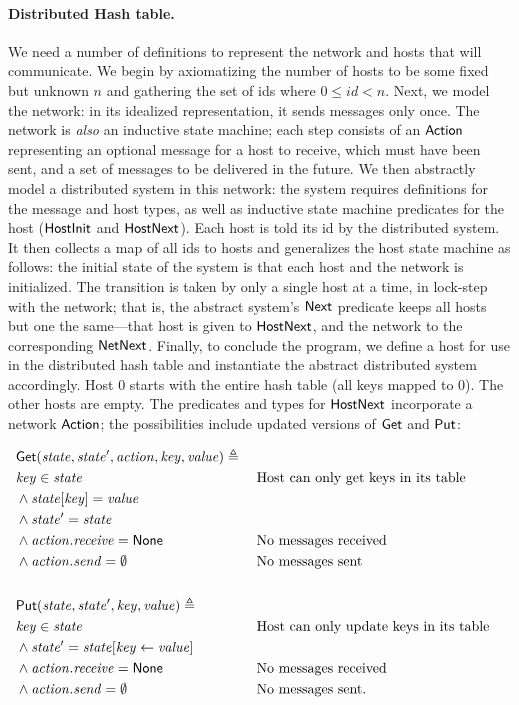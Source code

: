 \paragraph{Distributed Hash table.} We need a number of definitions to represent
the network and hosts that will communicate. We begin by axiomatizing the number
of hosts to be some fixed but unknown \(n\) and gathering the set of ids where
\(0 \le id < n\). Next, we model the network: in its idealized representation, it
sends messages only once. The network is \emph{also} an inductive state machine;
each step consists of an \(\mathsf{Action}\) representing an optional message for
a host to receive, which must have been sent, and a set of messages to be
delivered in the future. We then abstractly model a distributed system in this
network: the system requires definitions for the message and host types, as well
as inductive state machine predicates for the host (\(\mathsf{HostInit}\) and
\(\mathsf{HostNext}\)). Each host is told its id by the distributed system. It
then collects a map of all ids to hosts and generalizes the host state machine
as follows: the initial state of the system is that each host and the network is
initialized. The transition is taken by only a single host at a time, in
lock-step with the network; that is, the abstract system's \(\mathsf{Next}\)
predicate keeps all hosts but one the same---that host is given to
\(\mathsf{HostNext}\), and the network to the corresponding \(\mathsf{NetNext}\).
Finally, to conclude the program, we define a host for use in the distributed
hash table and instantiate the abstract distributed system accordingly. Host 0
starts with the entire hash table (all keys mapped to 0). The other hosts are
empty. The predicates and types for \(\mathsf{HostNext}\) incorporate a network
\(\mathsf{Action}\); the possibilities include updated versions of \(\mathsf{Get}\)
and \(\mathsf{Put}\):

\begin{alignat*}{2}
    & \mathsf{Get}(\mathit{state}, \mathit{state'}, \mathit{action}, \mathit{key}, \mathit{value}) \triangleq\; \\
    & \mathit{key} \in \mathit{state} && \text{Host can only get keys in its table} \\
    & \land \mathit{state}[\mathit{key}] = \mathit{value} \\
    & \land \mathit{state'} = \mathit{state} \\
    & \land \mathit{action.receive} = \mathsf{None} && \text{No messages received} \\
    & \land \mathit{action.send} = \emptyset && \text{No messages sent} \\
    \\
    & \mathsf{Put}(\mathit{state}, \mathit{state'}, \mathit{key}, \mathit{value}) \triangleq\; \\
    & \mathit{key} \in \mathit{state} && \text{Host can only update keys in its table} \\
    & \land \mathit{state'} = \mathit{state}[\mathit{key} \gets \mathit{value}] \\
    & \land \mathit{action.receive} = \mathsf{None} && \text{No messages received} \\
    & \land \mathit{action.send} = \emptyset && \text{No messages sent.}
\end{alignat*}

